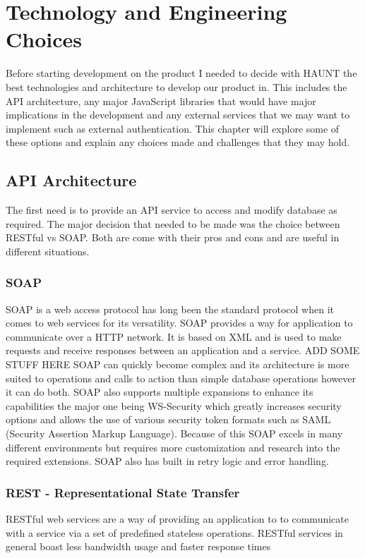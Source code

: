 \chapter{Technology and Engineering Choices}

Before starting development on the product I needed to decide with HAUNT the best technologies and architecture to develop our product in. This includes the API architecture, any major JavaScript libraries that would have major implications in the development and any external services that we may want to implement such as external authentication.
This chapter will explore some of these options and explain any choices made and challenges that they may hold.
  
\section{API Architecture}
The first need is to provide an API service to access and modify database as required. The major decision that needed to be made was the choice between RESTful vs SOAP. Both are come with their pros and cons and are useful in different situations.

\subsection{SOAP}
SOAP is a web access protocol has long been the standard protocol when it comes to web services for its versatility. SOAP provides a way for application to communicate over a HTTP network. It is based on XML and is used to make requests and receive responses between an application and a service.
ADD SOME STUFF HERE
SOAP can quickly become complex and its architecture is more suited to operations and calls to action than simple database operations however it can do both. SOAP also supports multiple expansions to enhance its capabilities the major one being WS-Security which greatly increases security options and allows the use of various security token formats such as SAML (Security Assertion Markup Language). Because of this SOAP excels in many different environments but requires more customization and research into the required extensions. SOAP also has built in retry logic and error handling.

\subsection{REST - Representational State Transfer}
RESTful web services are a way of providing an application to to communicate with a service via a set of predefined stateless operations. RESTful services in general boast less bandwidth usage and faster response times \cite{mumbaikar2013web}

